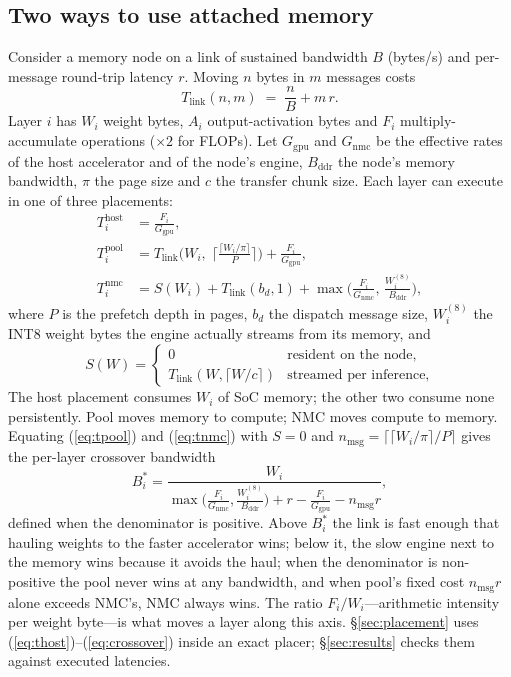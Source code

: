 \documentclass[lettersize,journal]{IEEEtran}
\begin{document}
\subsection{Two ways to use attached memory}
Consider a memory node on a link of sustained bandwidth $B$ (bytes/s) and per-message round-trip latency $r$. Moving $n$ bytes in $m$ messages costs
\begin{equation}
T_{\text{link}}(n, m) \;=\; \frac{n}{B} + m\,r .
\label{eq:link}
\end{equation}
Layer $i$ has $W_i$ weight bytes, $A_i$ output-activation bytes and $F_i$ multiply-accumulate operations ($\times 2$ for FLOPs). Let $G_{\text{gpu}}$ and $G_{\text{nmc}}$ be the effective rates of the host accelerator and of the node's engine, $B_{\text{ddr}}$ the node's memory bandwidth, $\pi$ the page size and $c$ the transfer chunk size. Each layer can execute in one of three placements:
\begin{align}
T^{\text{host}}_i &= \frac{F_i}{G_{\text{gpu}}}, \label{eq:thost}\\
T^{\text{pool}}_i &= T_{\text{link}}\!\Big(W_i,\; \Big\lceil \tfrac{\lceil W_i/\pi \rceil}{P} \Big\rceil \Big) + \frac{F_i}{G_{\text{gpu}}}, \label{eq:tpool}\\
T^{\text{nmc}}_i &= S(W_i) + T_{\text{link}}(b_d, 1) + \max\!\Big(\tfrac{F_i}{G_{\text{nmc}}},\, \tfrac{W_i^{(8)}}{B_{\text{ddr}}}\Big), \label{eq:tnmc}
\end{align}
where $P$ is the prefetch depth in pages, $b_d$ the dispatch message size, $W_i^{(8)}$ the INT8 weight bytes the engine actually streams from its memory, and
\begin{equation}
S(W) = \begin{cases} 0 & \text{resident on the node,}\\ T_{\text{link}}(W, \lceil W/c \rceil) & \text{streamed per inference,} \end{cases}
\label{eq:stream}
\end{equation}
The host placement consumes $W_i$ of SoC memory; the other two consume none persistently. Pool moves memory to compute; NMC moves compute to memory. Equating (\ref{eq:tpool}) and (\ref{eq:tnmc}) with $S = 0$ and $n_{\text{msg}} = \lceil \lceil W_i/\pi\rceil / P\rceil$ gives the per-layer crossover bandwidth
\begin{equation}
B^{*}_i = \frac{W_i}{\max\!\big(\tfrac{F_i}{G_{\text{nmc}}}, \tfrac{W_i^{(8)}}{B_{\text{ddr}}}\big) + r - \tfrac{F_i}{G_{\text{gpu}}} - n_{\text{msg}} r},
\label{eq:crossover}
\end{equation}
defined when the denominator is positive. Above $B^{*}_i$ the link is fast enough that hauling weights to the faster accelerator wins; below it, the slow engine next to the memory wins because it avoids the haul; when the denominator is non-positive the pool never wins at any bandwidth, and when pool's fixed cost $n_{\text{msg}} r$ alone exceeds NMC's, NMC always wins. The ratio $F_i/W_i$---arithmetic intensity per weight byte---is what moves a layer along this axis. \S\ref{sec:placement} uses (\ref{eq:thost})--(\ref{eq:crossover}) inside an exact placer; \S\ref{sec:results} checks them against executed latencies.
\end{document}
